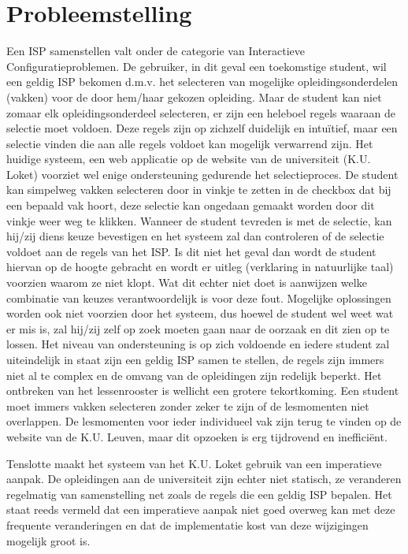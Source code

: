 \section{Probleemstelling}
Een ISP samenstellen valt onder de categorie van Interactieve Configuratieproblemen. De gebruiker, in dit geval een toekomstige student, wil een geldig ISP bekomen d.m.v. het selecteren van mogelijke opleidingsonderdelen (vakken) voor de door hem/haar gekozen opleiding. Maar de student kan niet zomaar elk opleidingsonderdeel selecteren, er zijn een heleboel regels waaraan de selectie moet voldoen. Deze regels zijn op zichzelf duidelijk en intu\"{i}tief, maar een selectie vinden die aan alle regels voldoet kan mogelijk verwarrend zijn. Het huidige systeem, een web applicatie op de website van de universiteit (K.U. Loket) voorziet wel enige ondersteuning gedurende het selectieproces. De student kan simpelweg vakken selecteren door in vinkje te zetten in de checkbox dat bij een bepaald vak hoort, deze selectie kan ongedaan gemaakt worden door dit vinkje weer weg te klikken. Wanneer de student tevreden is met de selectie, kan hij/zij diens keuze bevestigen en het systeem zal dan controleren of de selectie voldoet aan de regels van het ISP. Is dit niet het geval dan wordt de student hiervan op de hoogte gebracht en wordt er uitleg (verklaring in natuurlijke taal) voorzien waarom ze niet klopt. Wat dit echter niet doet is aanwijzen welke combinatie van keuzes verantwoordelijk is voor deze fout. Mogelijke oplossingen worden ook niet voorzien door het systeem, dus hoewel de student wel weet wat er mis is, zal hij/zij zelf op zoek moeten gaan naar  de oorzaak en dit zien op te lossen. Het niveau van ondersteuning is op zich voldoende en iedere student zal uiteindelijk in staat zijn een geldig ISP samen te stellen, de regels zijn immers niet al te complex en de omvang van de opleidingen zijn redelijk beperkt. Het ontbreken van het lessenrooster is wellicht een grotere tekortkoming. Een student moet immers vakken selecteren zonder zeker te zijn of de lesmomenten niet overlappen. De lesmomenten voor ieder individueel vak zijn terug te vinden op de website van de K.U. Leuven, maar dit opzoeken is erg tijdrovend en ineffici\"{e}nt. 

Tenslotte maakt het systeem van het K.U. Loket gebruik van een imperatieve aanpak. De opleidingen aan de universiteit zijn echter niet statisch, ze veranderen regelmatig van samenstelling net zoals de regels die een geldig ISP bepalen. Het staat reeds vermeld dat een imperatieve aanpak niet goed overweg kan met deze frequente veranderingen en dat de implementatie kost van deze wijzigingen mogelijk groot is. 

